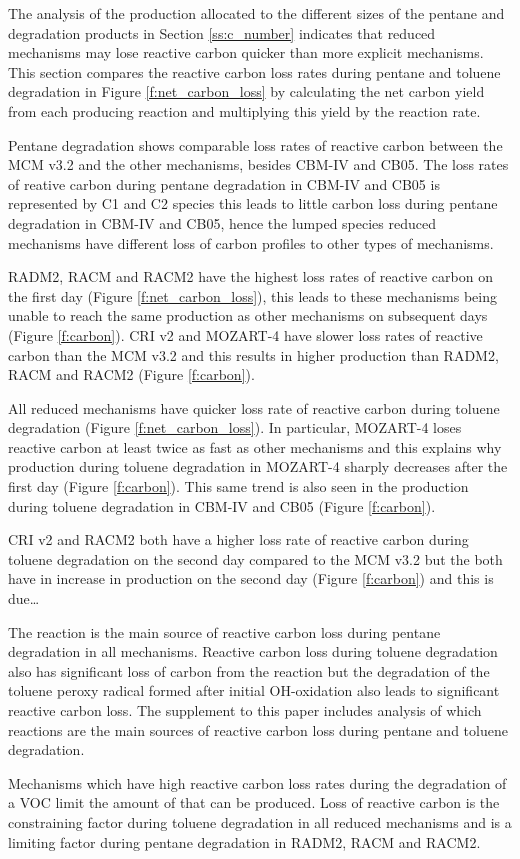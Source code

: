 The analysis of the  production allocated to the different sizes of the pentane and degradation products in Section \ref{ss:c_number} indicates that reduced mechanisms may lose reactive carbon quicker than more explicit mechanisms.
This section compares the reactive carbon loss rates during pentane and toluene degradation in Figure \ref{f:net_carbon_loss} by calculating the net carbon yield from each  producing reaction and multiplying this yield by the reaction rate.

Pentane degradation shows comparable loss rates of reactive carbon between the MCM v3.2 and the other mechanisms, besides CBM-IV and CB05.
The loss rates of reative carbon during pentane degradation in CBM-IV and CB05 is represented by C1 and C2 species this leads to little carbon loss during pentane degradation in CBM-IV and CB05, hence the lumped species reduced mechanisms have different loss of carbon profiles to other types of mechanisms.

RADM2, RACM and RACM2 have the highest loss rates of reactive carbon on the first day (Figure \ref{f:net_carbon_loss}), this leads to these mechanisms being unable to reach the same  production as other mechanisms on subsequent days (Figure \ref{f:carbon}).
CRI v2 and MOZART-4 have slower loss rates of reactive carbon than the MCM v3.2 and this results in higher  production than RADM2, RACM and RACM2 (Figure \ref{f:carbon}).

All reduced mechanisms have quicker loss rate of reactive carbon during toluene degradation (Figure \ref{f:net_carbon_loss}).
In particular, MOZART-4 loses reactive carbon at least twice as fast as other mechanisms and this explains why  production during toluene degradation in MOZART-4 sharply decreases after the first day (Figure \ref{f:carbon}).
This same trend is also seen in the  production during toluene degradation in CBM-IV and CB05 (Figure \ref{f:carbon}).

CRI v2 and RACM2 both have a higher loss rate of reactive carbon during toluene degradation on the second day compared to the MCM v3.2 but the both have in increase in  production on the second day (Figure \ref{f:carbon}) and this is due\ldots

The  reaction is the main source of reactive carbon loss during pentane degradation in all mechanisms.
Reactive carbon loss during toluene degradation also has significant loss of carbon from the  reaction but the degradation of the toluene peroxy radical formed after initial OH-oxidation also leads to significant reactive carbon loss.
The supplement to this paper includes analysis of which reactions are the main sources of reactive carbon loss during pentane and toluene degradation.

Mechanisms which have high reactive carbon loss rates during the degradation of a VOC limit the amount of  that can be produced.
Loss of reactive carbon is the constraining factor during toluene degradation in all reduced mechanisms and is a limiting factor during pentane degradation in RADM2, RACM and RACM2.
